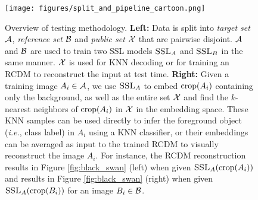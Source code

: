 \begin{figure}[t]
     \texttt{[image: figures/split\_and\_pipeline\_cartoon.png]}
\caption{
Overview of testing methodology. \textbf{Left:} Data is split into \emph{target set} $\mathcal{A}$, \emph{reference set} $\mathcal{B}$ and \emph{public set} $\mathcal{X}$ that are pairwise disjoint. $\mathcal{A}$ and $\mathcal{B}$ are used to train two SSL models $\textsc{SSL}_A$ and $\textsc{SSL}_B$ in the same manner. $\mathcal{X}$ is used for KNN decoding or for training an RCDM to reconstruct the input at test time. \textbf{Right:} Given a training image $A_i \in \mathcal{A}$, we use $\textsc{SSL}_A$ to embed $\mathrm{crop}({A_i})$ containing only the background, as well as the entire set $\mathcal{X}$ and find the $k$-nearest neighbors of $\mathrm{crop}({A_i})$ in $\mathcal{X}$ in the embedding space. These KNN samples can be used directly to infer the foreground object (\emph{i.e.}, class label) in $A_i$ using a KNN classifier, or their embeddings can be averaged as input to the trained RCDM to visually reconstruct the image $A_i$. For instance, the RCDM reconstruction results in Figure \ref{fig:black_swan} (left) when given $\textsc{SSL}_A(\mathrm{crop}({A_i}))$ and results in Figure \ref{fig:black_swan} (right) when given $\textsc{SSL}_A(\mathrm{crop}({B_i}))$ for an image $B_i \in \mathcal{B}$.
}
\end{figure}
